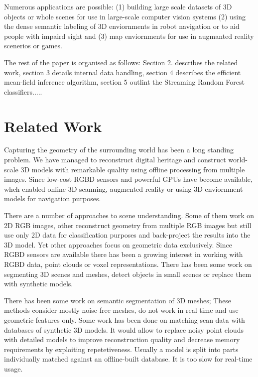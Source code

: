 \documentclass{llncs}
\begin{document}
  Numerous applications are possible: (1) building large scale datasets of 3D objects or whole scenes for use in large-scale computer vision systems (2) using the dense semantic labeling of 3D enviornments in robot navigation or to aid people with impaird sight and (3) map enviornments for use in augmanted reality scenerios or games. 
  
  The rest of the paper is organised as follows: Section 2. describes the related work, section 3 details internal data handling, section 4 describes the efficient mean-field inference algorithm, section 5 outlint the Streaming Random Forest classifiers.....


\section{Related Work}
  
    
    Capturing the geometry of the surrounding world has been a long standing problem. We have managed to reconstruct digital heritage and construct world-scale 3D models with remarkable quality using offline processing from multiple images. Since low-cost RGBD sensors and powerful GPUs have become available, whch enabled online 3D scanning, augmented reality or using 3D enviornment models for navigation purposes.
  
    
      There are a number of approaches to scene understanding. Some of them work on 2D RGB images, other reconstruct geometry from multiple RGB images but still use only 2D data for classification purposes and back-project the results into the 3D model. Yet other approaches focus on geometric data exclusively. Since RGBD sensors are available there has been a growing interest in working with RGBD data, point clouds or voxel representations. There has been some work on segmenting 3D scenes and meshes, detect objects in small scenes or replace them with synthetic models. 
      
      There has been some work on semantic segmentation of 3D meshes; These methods consider mostly noise-free meshes, do not work in real time and use geometric features only. Some work has been done on matching scan data with databases of synthetic 3D models. It would allow to replace noisy point clouds with detailed models to improve reconstruction quality and decrease memory requirements by exploiting repetetiveness. Usually a model is split into parts individually matched against an offline-built database. It is too slow for real-time usage. 
      
\end{document}
